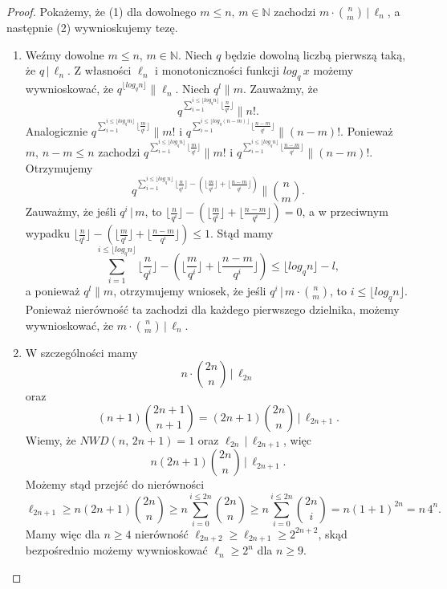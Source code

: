 \documentclass[polish,declaration,shortabstract]{iithesis}
\theoremstyle{definition}
\theoremstyle{remark} \newtheorem{observation}{Obserwacja}
\theoremstyle{plain} \newtheorem{theorem}{Twierdzenie}
\theoremstyle{plain} \newtheorem{lemma}{Lemat}
\theoremstyle{remark} \newtheorem*{remark*}{Uwaga}
\theoremstyle{reminder} \newtheorem*{reminder*}{Przypomnienie}
\begin{document}
\begin{proof}
	Pokażemy, że (1) dla dowolnego $m \leq n, \, m \in \mathbb{N}$ zachodzi $m \cdot {n \choose m} \, | \, \ell_n$, a następnie (2) wywnioskujemy tezę.
	\begin{enumerate}[label=(\arabic*),leftmargin=.4in]
		\item Weźmy dowolne $m \leq n, \, m \in \mathbb{N}$. Niech $q$ będzie dowolną liczbą pierwszą taką, że $q \, | \, \ell_n$. Z własności $\ell_n$ i monotoniczności funkcji $log_q\, x$ możemy wywnioskować, że $q^{\lfloor log_q n \rfloor} \parallel \ell_n$. Niech $q^l \parallel m$. Zauważmy, że \[q^{\sum_{i=1}^{i \leq \lfloor log_q n \rfloor} \lfloor \frac{n}{q^i}\rfloor} \parallel n!.\] Analogicznie $q^{\sum_{i=1}^{i \leq \lfloor log_q m \rfloor} \lfloor \frac{m}{q^i}\rfloor} \parallel m!$ i $q^{\sum_{i=1}^{i \leq \lfloor log_q (n-m) \rfloor} \lfloor \frac{n-m}{q^i}\rfloor} \parallel (n-m)!$. Ponieważ $m, \, n - m \leq n$ zachodzi $q^{\sum_{i=1}^{i \leq \lfloor log_q n \rfloor} \lfloor \frac{m}{q^i}\rfloor} \parallel m!$ i $q^{\sum_{i=1}^{i \leq \lfloor log_q n \rfloor} \lfloor \frac{n-m}{q^i}\rfloor} \parallel (n-m)!$. 
		      Otrzymujemy \[q^{\sum_{i=1}^{i \leq \lfloor log_q n \rfloor} \lfloor \frac{n}{q^i}\rfloor - (\lfloor \frac{m}{q^i}\rfloor + \lfloor \frac{n-m}{q^i}\rfloor)} \parallel {n \choose m}.\]    
		      Zauważmy, że jeśli $q^i \, | \, m$, to $\lfloor \frac{n}{q^i}\rfloor - (\lfloor \frac{m}{q^i}\rfloor + \lfloor \frac{n-m}{q^i}\rfloor) = 0$, a w przeciwnym wypadku $\lfloor \frac{n}{q^i}\rfloor - (\lfloor \frac{m}{q^i}\rfloor + \lfloor \frac{n-m}{q^i}\rfloor) \leq 1$. Stąd mamy \[\sum_{i=1}^{i \leq \lfloor log_qn \rfloor} \lfloor \frac{n}{q^i}\rfloor - (\lfloor \frac{m}{q^i}\rfloor + \lfloor \frac{n-m}{q^i}\rfloor) \leq \lfloor log_qn \rfloor - l,\] a ponieważ $q^l \parallel m$, otrzymujemy wniosek, że jeśli $q^i \, | \, m \cdot {n \choose m}$, to $i \leq \lfloor log_qn \rfloor$. Ponieważ nierówność ta zachodzi dla każdego pierwszego dzielnika, możemy wywnioskować, że $m \cdot {n \choose m} \, | \, \ell_n$.
		\item W szczególności mamy \[n \cdot {2n \choose n} \, | \, \ell_{2n}\] oraz \[(n+1){2n + 1 \choose n + 1} = (2n + 1){2n \choose n}\, |\, \ell_{2n+1}.\] Wiemy, że $NWD(n,\, 2n + 1) = 1$ oraz $\ell_{2n} \, | \, \ell_{2n + 1}$, więc \[n(2n + 1){2n \choose n}\, |\, \ell_{2n + 1}.\] Możemy stąd przejść do nierówności \[\ell_{2n + 1} \geq n(2n + 1){2n \choose n} \geq n \sum_{i=0}^{i \leq 2n}{2n \choose n} \geq n {\sum_{i=0}^{i \leq 2n}{2n \choose i}} = n(1 + 1)^{2n} = n \, 4^n.\]
		      Mamy więc dla $n \geq 4$ nierówność $\ell_{2n+2} \geq \ell_{2n+1} \geq 2^{2n + 2}$, skąd bezpośrednio możemy wywnioskować $\ell_n \geq 2^n$ dla $n \geq 9$.
	\end{enumerate}		
\end{proof}
\end{document}
